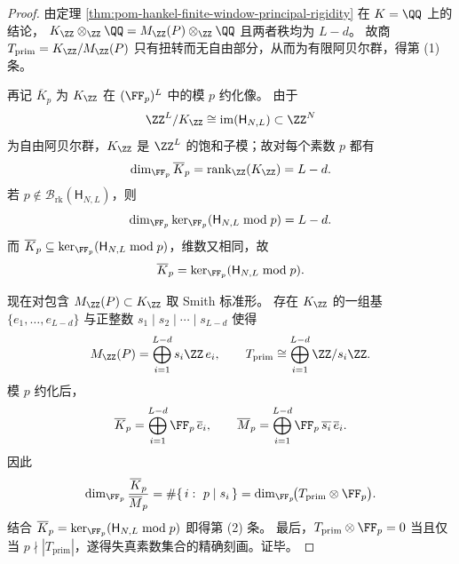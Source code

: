 \begin{proof}
由定理 \ref{thm:pom-hankel-finite-window-principal-rigidity} 在 \(K=\QQ\) 上的结论，
\(
K_{\ZZ}\otimes_{\ZZ}\QQ=M_{\ZZ}(P)\otimes_{\ZZ}\QQ
\)
且两者秩均为 \(L-d\)。
故商 \(T_{\mathrm{prim}}=K_{\ZZ}/M_{\ZZ}(P)\) 只有扭转而无自由部分，从而为有限阿贝尔群，得第 (1) 条。

再记
\(
\overline{K}_p
\)
为 \(K_{\ZZ}\) 在 \((\FF_p)^L\) 中的模 \(p\) 约化像。
由于
\[
\ZZ^L/K_{\ZZ}\cong \operatorname{im}(\mathsf H_{N,L})\subset \ZZ^N
\]
为自由阿贝尔群，\(K_{\ZZ}\) 是 \(\ZZ^L\) 的饱和子模；故对每个素数 \(p\) 都有
\[
\dim_{\FF_p}\overline{K}_p=\operatorname{rank}_{\ZZ}(K_{\ZZ})=L-d.
\]
若 \(p\notin \mathcal B_{\mathrm{rk}}(\mathsf H_{N,L})\)，则
\[
\dim_{\FF_p}\ker_{\FF_p}(\mathsf H_{N,L}\bmod p)=L-d.
\]
而 \(\overline{K}_p\subseteq \ker_{\FF_p}(\mathsf H_{N,L}\bmod p)\)，维数又相同，故
\[
\overline{K}_p=\ker_{\FF_p}(\mathsf H_{N,L}\bmod p).
\]

现在对包含 \(M_{\ZZ}(P)\subset K_{\ZZ}\) 取 Smith 标准形。
存在 \(K_{\ZZ}\) 的一组基 \(\{e_1,\dots,e_{L-d}\}\) 与正整数
\(
s_1\mid s_2\mid\cdots\mid s_{L-d}
\)
使得
\[
M_{\ZZ}(P)=\bigoplus_{i=1}^{L-d}s_i\ZZ\,e_i,
\qquad
T_{\mathrm{prim}}\cong \bigoplus_{i=1}^{L-d}\ZZ/s_i\ZZ.
\]
模 \(p\) 约化后，
\[
\overline{K}_p=\bigoplus_{i=1}^{L-d}\FF_p\,\overline e_i,
\qquad
\overline{M}_p=\bigoplus_{i=1}^{L-d}\FF_p\,\overline{s_i}\,\overline e_i.
\]
因此
\[
\dim_{\FF_p}\frac{\overline{K}_p}{\overline{M}_p}
=
\#\{\,i:\ p\mid s_i\,\}
=
\dim_{\FF_p}\!\bigl(T_{\mathrm{prim}}\otimes\FF_p\bigr).
\]
结合 \(\overline{K}_p=\ker_{\FF_p}(\mathsf H_{N,L}\bmod p)\) 即得第 (2) 条。
最后，\(T_{\mathrm{prim}}\otimes\FF_p=0\) 当且仅当 \(p\nmid |T_{\mathrm{prim}}|\)，遂得失真素数集合的精确刻画。证毕。
\end{proof}

\endinput
